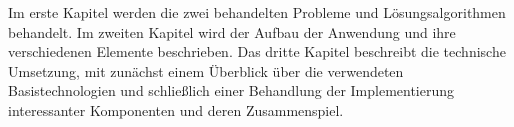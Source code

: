 Im erste Kapitel werden die zwei behandelten Probleme und Lösungsalgorithmen behandelt. Im zweiten Kapitel wird der Aufbau der Anwendung und ihre verschiedenen Elemente beschrieben. Das dritte Kapitel beschreibt die technische Umsetzung, mit zunächst einem Überblick über die verwendeten Basistechnologien und schließlich einer Behandlung der Implementierung interessanter Komponenten und deren Zusammenspiel.